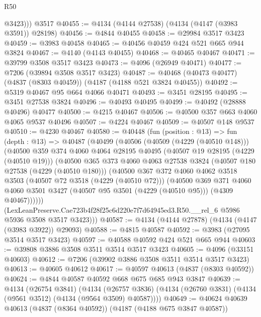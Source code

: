 \begin{lexlean}{R50}
\begin{coremodule}
          @3423)))
    @3517
@40455 := @4134 (@4144 @27538) (@4134 (@4147 (@3983 @3591)) @28198)
@40456 := @4844 @40455
@40458 := @29984 @3517 @3423
@40459 := @3983 @40458
@40465 := @40456 @40459 @424 @521 @665 @944 @3824
@40467 := @4140 (@4143 @40455)
@40468 := @40465 @40467
@40471 := @39799 @3508 @3517 @3423
@40473 := @4096 (@26949 @40471)
@40477 := @7206 (@39894 @3508 @3517 @3423)
@40487 := @40468 (@40473 @40477) (@4837 (@8303 @40459)) (@4187 (@4188 @521 @3824 @40455))
@40492 := @5319 @40467 @95 @664 @4066 @40471
@40493 := @3451 @28195
@40495 := @3451 @27538 @3824
@40496 := @40493 @40495
@40499 := @40492 (@28888 @40496) @40477
@40500 := @4215 @40467
@40506 := @40500 @357 @663 @4060 @4065 @9537 @40496
@40507 := @4224 @40467
@40509 := @40507 @148 @9537
@40510 := @4230 @40467
@40580 := @40448
    (fun (position : @13) =>
    fun (depth : @13) =>
    @40487
      (@40499
        (@40506
          (@40509 (@4229 (@40510 @148)))
          (@40500
            @359
            @374
            @4060
            @4064
            @28195
            @40495
            (@40507 @19 @28195 (@4229 (@40510 @19)))
            (@40500
              @365
              @373
              @4060
              @4063
              @27538
              @3824
              (@40507 @180 @27538 (@4229 (@40510 @180)))
              (@40500
                @367
                @372
                @4060
                @4062
                @3518
                @3503
                (@40507 @72 @3518 (@4229 (@40510 @72)))
                (@40500
                  @369
                  @371
                  @4060
                  @4060
                  @3501
                  @3427
                  (@40507 @95 @3501 (@4229 (@40510 @95)))
                  (@4309 @40467))))))
        (LexLeanPreserve.Cae723b4f28f25c6d220e7f7d64945ed3.R50.__rel_6
          @5986
          @5936
          @3508
          @3517
          @3423)))
@40587 := @4134 (@4144 @27878) (@4134 (@4147 (@3983 @3922)) @29093)
@40588 := @4815 @40587
@40592 := @3983 (@27095 @3514 @3517 @3423)
@40597 := @40588 @40592 @424 @521 @665 @944
@40603 := @39808 @3886 @3508 @3511 @3514 @3517 @3423
@40605 := @4096 (@33151 @40603)
@40612 := @7206 (@39902 @3886 @3508 @3511 @3514 @3517 @3423)
@40613 := @40605 @40612
@40617 := @40597 @40613 (@4837 (@8303 @40592))
@40624 := @4844 @40587 @40592 @668 @675 @685 @943 @3847
@40639 := @4134
    (@26754 @3841)
    (@4134 (@26757 @3836) (@4134 (@26760 @3831) (@4134 (@9561 @3512) (@4134 (@9564 @3509) @40587))))
@40649 := @40624 @40639 @40613 (@4837 (@8364 @40592)) (@4187 (@4188 @675 @3847 @40587))

\end{coremodule}
\end{lexlean}
